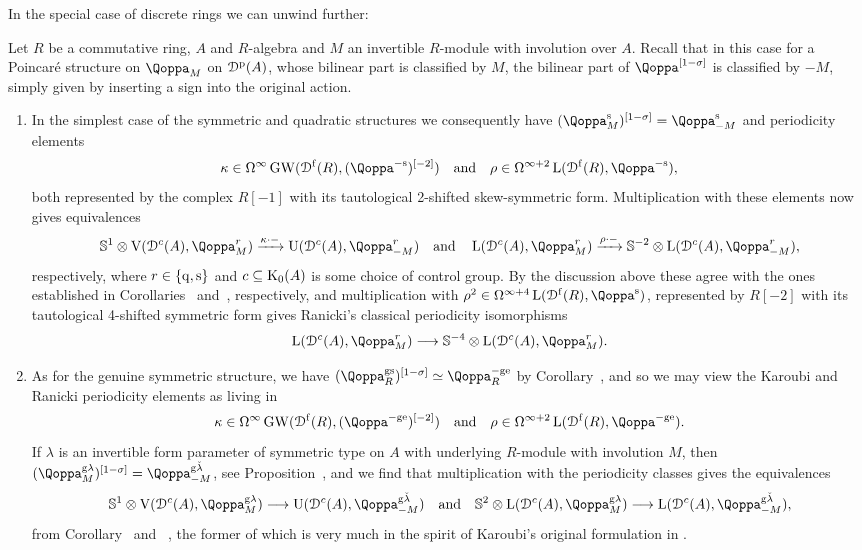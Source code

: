In the special case of discrete rings we can unwind further:

\begin{example}
\label{example:perclasses}%
Let $R$ be a commutative ring, $A$ and $R$-algebra and $M$ an invertible $R$-module with involution over $A$. Recall that in this case for a Poincaré structure on $\QF_M$ on ${\mathcal D}^{\mathrm{p}}(A)$, whose bilinear part is classified by $M$, the bilinear part of $\QF\qshift{1-\sigma}$ is classified by $-M$, simply given by inserting a sign into the original action. 
\begin{enumerate}
\item In the simplest case of the symmetric and quadratic structures we consequently have $(\QF^\sym_M)\qshift{1-\sigma} = \QF^\sym_{-M}$ and periodicity elements 
\[
\kappa \in \Om^{\infty}\GW(\Dfree(R),(\QF^{-\sym})\qshift{-2}) \quad \text{and} \quad \rho \in \Om^{\infty+2}\L(\Dfree(R),\QF^{-\sym}),
\]
both represented by the complex $R[-1]$ with its tautological 2-shifted skew-symmetric form. Multiplication with these elements now gives equivalences
\[
\mathbb S^1 \otimes \mathrm V(\D^c(A),\QF^r_{M}) \xrightarrow{\kappa \cdot -} \mathrm U(\D^c(A),\QF^r_{-M}) \quad \text{and} \quad \L(\D^c(A),\QF^r_M) \xrightarrow{\rho \cdot -} \SS^{-2}\otimes \L(\D^c(A),\QF^r_{-M}),
\]
respectively, where $r \in \{\mathrm{q},\mathrm{s}\}$ and $c \subseteq \operatorname K_0(A)$ is some choice of control group. By the discussion above these agree with the ones established in Corollaries~ and~, respectively, 
and multiplication with $\rho^2 \in \Om^{\infty+4}\L(\Dfree(R),\QF^\sym)$, represented by $R[-2]$ with its tautological 4-shifted symmetric form 
gives Ranicki's classical periodicity isomorphisms
\[
\L(\D^c(A),\QF^r_M) \longrightarrow \SS^{-4}\otimes \L(\D^c(A),\QF^r_{M}).
\]
\item As for the genuine symmetric structure, we have $(\QF^{\mathrm g\sym}_R)\qshift{1-\sigma} \simeq \QF^{-\gev}_R$ by Corollary~, and so we may view the Karoubi and Ranicki periodicity elements as living in
\[
\kappa \in \Om^{\infty}\GW(\Dfree(R),(\QF^{-\gev})\qshift{-2}) \quad \text{and} \quad \rho \in \Om^{\infty+2}\L(\Dfree(R),\QF^{-\gev}).
\]
If $\lambda$ is an invertible form parameter of symmetric type on $A$ with underlying $R$-module with involution $M$, then $(\QF^{\mathrm g\lambda}_M)\qshift{1-\sigma} = \QF^{\mathrm g \check{\lambda}}_{-M}$, see Proposition~, and we find that multiplication with the periodicity classes
gives the equivalences
\[
\mathbb S^1 \otimes \mathrm V(\D^c(A),\QF^{\mathrm g\lambda}_{M}) \longrightarrow \mathrm U(\D^c(A),\QF^{\mathrm g\check{\lambda}}_{-M}) \quad \text{and} \quad \mathbb S^{2} \otimes \L(\D^c(A),\QF^{\mathrm g\lambda}_{M}) \longrightarrow \L(\D^c(A),\QF^{\mathrm g\check{\lambda}}_{-M}),
\]
from Corollary~ and%
~, the former of which is very much in the spirit of Karoubi's original formulation in \cite{karoubi-periodicity}. 

\end{enumerate}
\end{example}

